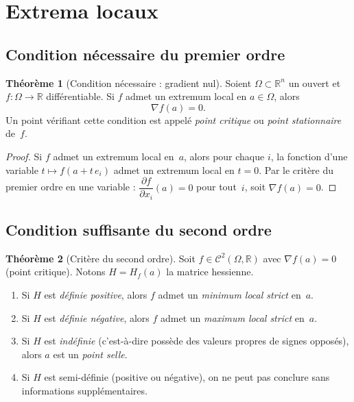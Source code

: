 \documentclass[12pt,a4paper,openany]{book}
\theoremstyle{definition}
\newtheorem{theoreme}{Théorème}[chapter]
\newcommand{\R}{\mathbb{R}}
\begin{document}
\section{Extrema locaux}
\label{sec:extrema-locaux}

\subsection{Condition nécessaire du premier ordre}

\begin{theoreme}[Condition nécessaire : gradient nul]
  \label{thm:condition-necessaire-gradient}
  Soient $\Omega \subset \R^n$ un ouvert et $f \colon \Omega \to \R$ différentiable. Si $f$ admet un extremum local en $a \in \Omega$, alors
  \[
    \nabla f(a) = 0.
  \]
  Un point vérifiant cette condition est appelé \emph{point critique} ou \emph{point stationnaire} de~$f$.
\end{theoreme}

\begin{proof}
  Si $f$ admet un extremum local en~$a$, alors pour chaque $i$, la fonction d'une variable $t \mapsto f(a + t\,e_i)$ admet un extremum local en $t = 0$. Par le critère du premier ordre en une variable : $\dfrac{\partial f}{\partial x_i}(a) = 0$ pour tout~$i$, soit $\nabla f(a) = 0$.
\end{proof}

\subsection{Condition suffisante du second ordre}

\begin{theoreme}[Critère du second ordre]
  \label{thm:critere-second-ordre}
  Soit $f \in \mathcal{C}^2(\Omega, \R)$ avec $\nabla f(a) = 0$ (point critique). Notons $H = H_f(a)$ la matrice hessienne.
  \begin{enumerate}[label=(\roman*)]
    \item Si $H$ est \emph{définie positive}, alors $f$ admet un \emph{minimum local strict} en~$a$.
    \item Si $H$ est \emph{définie négative}, alors $f$ admet un \emph{maximum local strict} en~$a$.
    \item Si $H$ est \emph{indéfinie} (c'est-à-dire possède des valeurs propres de signes opposés), alors $a$ est un \emph{point selle}.
    \item Si $H$ est semi-définie (positive ou négative), on ne peut pas conclure sans informations supplémentaires.
  \end{enumerate}
\end{theoreme}
\end{document}
